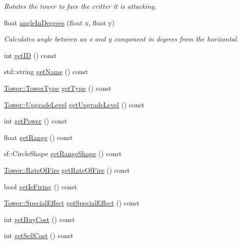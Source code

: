 \begin{DoxyCompactItemize}
\begin{DoxyCompactList}\small\item\em Rotates the tower to face the critter it is attacking. \end{DoxyCompactList}\item 
float \hyperlink{class_tower_a87355667f1139c8744042879ee0936ad}{angle\+In\+Degrees} (float x, float y)
\begin{DoxyCompactList}\small\item\em Calculates angle between an x and y component in degrees from the horizontal. \end{DoxyCompactList}\item 
int \hyperlink{class_tower_abe79d42828ca9c8ba4b60263e566697f}{get\+I\+D} () const 
\item 
std\+::string \hyperlink{class_tower_ad830cdd9f1870479b5763b7ee9c33c8d}{get\+Name} () const 
\item 
\hyperlink{class_tower_a110a21c18d4ec095c6234bd17f004b3e}{Tower\+::\+Tower\+Type} \hyperlink{class_tower_a87db306927fd4022cae1369b88688ed7}{get\+Type} () const 
\item 
\hyperlink{class_tower_a23889cd9ee2fbae0420c97105fd6ebc8}{Tower\+::\+Upgrade\+Level} \hyperlink{class_tower_ae8236cf1fac3f2fd791312e3dc59d904}{get\+Upgrade\+Level} () const 
\item 
int \hyperlink{class_tower_a198af6f04dad766d019b72fc667b90a7}{get\+Power} () const 
\item 
float \hyperlink{class_tower_ac11ad49620dd4af1a72459508ca0856a}{get\+Range} () const 
\item 
sf\+::\+Circle\+Shape \hyperlink{class_tower_a829a95b9dc022cc07ecd4d5c0afa7260}{get\+Range\+Shape} () const 
\item 
\hyperlink{class_tower_ae82ae8201f8921eb64878d2c9ecb5bb2}{Tower\+::\+Rate\+Of\+Fire} \hyperlink{class_tower_acf53d0a9123761730bd3e737a5b5a854}{get\+Rate\+Of\+Fire} () const 
\item 
bool \hyperlink{class_tower_a488db197289e0850f573310a13cfecef}{get\+Is\+Firing} () const 
\item 
\hyperlink{class_tower_a355ab1cbcfd8c4d037ccf8937f784445}{Tower\+::\+Special\+Effect} \hyperlink{class_tower_a9ef4f0f087f1bc09fe0e4e30e44ca6a5}{get\+Special\+Effect} () const 
\item 
int \hyperlink{class_tower_af2bb341e8011c2526ad5c58e11d79b28}{get\+Buy\+Cost} () const 
\item 
int \hyperlink{class_tower_adae75d4203ca7c3a92da1fe367d64bac}{get\+Sell\+Cost} () const 

\end{DoxyCompactItemize}
